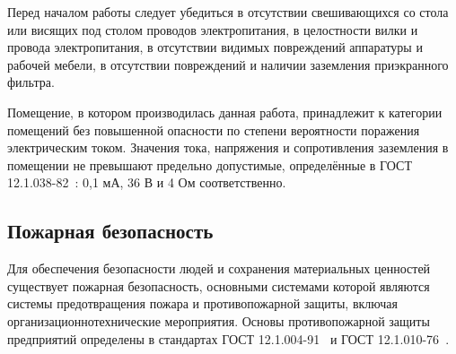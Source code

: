 

Перед началом работы следует убедиться в отсутствии свешивающихся со стола или висящих под столом проводов электропитания, в целостности вилки и провода электропитания, в отсутствии видимых повреждений аппаратуры и рабочей мебели, в отсутствии повреждений и наличии заземления приэкранного фильтра.

Помещение, в котором производилась данная работа, принадлежит к категории помещений без повышенной опасности по степени вероятности поражения электрическим током.
Значения тока, напряжения и сопротивления заземления в помещении не превышают предельно допустимые, определённые в ГОСТ 12.1.038-82~\cite{Gost1983}: 0,1 мА, 36 В и 4 Ом соответственно.


\subsection{Пожарная безопасность}

Для обеспечения безопасности людей и сохранения материальных ценностей существует пожарная безопасность, основными системами которой являются системы предотвращения пожара и противопожарной защиты, включая организационно\-технические мероприятия.
%
Основы противопожарной защиты предприятий определены в стандартах ГОСТ 12.1.004-91~\cite{Gost1992} и ГОСТ 12.1.010-76~\cite{Gost1976}.

